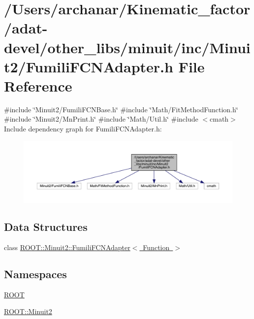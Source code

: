 \hypertarget{adat-devel_2other__libs_2minuit_2inc_2Minuit2_2FumiliFCNAdapter_8h}{}\section{/\+Users/archanar/\+Kinematic\+\_\+factor/adat-\/devel/other\+\_\+libs/minuit/inc/\+Minuit2/\+Fumili\+F\+C\+N\+Adapter.h File Reference}
\label{adat-devel_2other__libs_2minuit_2inc_2Minuit2_2FumiliFCNAdapter_8h}
{\ttfamily \#include \char`\"{}Minuit2/\+Fumili\+F\+C\+N\+Base.\+h\char`\"{}}\newline
{\ttfamily \#include \char`\"{}Math/\+Fit\+Method\+Function.\+h\char`\"{}}\newline
{\ttfamily \#include \char`\"{}Minuit2/\+Mn\+Print.\+h\char`\"{}}\newline
{\ttfamily \#include \char`\"{}Math/\+Util.\+h\char`\"{}}\newline
{\ttfamily \#include $<$cmath$>$}\newline
Include dependency graph for Fumili\+F\+C\+N\+Adapter.\+h\+:
\nopagebreak
\begin{figure}[H]
\begin{center}
\leavevmode
\includegraphics[width=350pt]{de/dbd/adat-devel_2other__libs_2minuit_2inc_2Minuit2_2FumiliFCNAdapter_8h__incl}
\end{center}
\end{figure}
\subsection*{Data Structures}
\begin{DoxyCompactItemize}
\item 
class \mbox{\hyperlink{classROOT_1_1Minuit2_1_1FumiliFCNAdapter}{R\+O\+O\+T\+::\+Minuit2\+::\+Fumili\+F\+C\+N\+Adapter$<$ Function $>$}}
\end{DoxyCompactItemize}
\subsection*{Namespaces}
\begin{DoxyCompactItemize}
\item 
 \mbox{\hyperlink{namespaceROOT}{R\+O\+OT}}
\item 
 \mbox{\hyperlink{namespaceROOT_1_1Minuit2}{R\+O\+O\+T\+::\+Minuit2}}
\end{DoxyCompactItemize}
